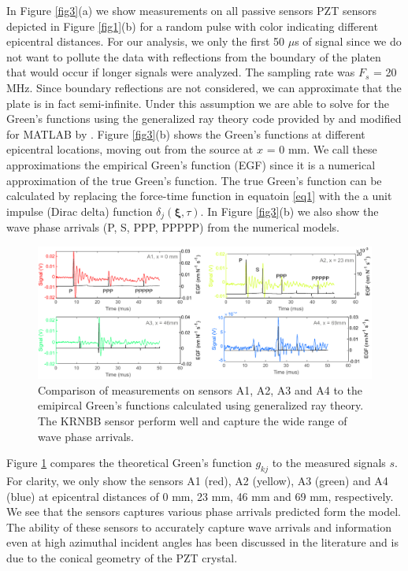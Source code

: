 \documentclass[preprint,3p, 11pt,authoryear]{elsarticle}
\begin{document}
{In Figure \ref{fig3}(a) we show measurements on all passive sensors PZT sensors depicted in Figure \ref{fig1}(b) for a random pulse with color indicating different epicentral distances. For our analysis, we only the first 50 $\mu$s of signal since we do not want to pollute the data with reflections from the boundary of the platen that would occur if longer signals were analyzed. The sampling rate was $F_{s}$ = 20 MHz. Since boundary reflections are not considered, we can approximate that the plate is in fact semi-infinite. Under this assumption we are able to solve for the Green's functions using the generalized ray theory code provided by \citet{Hsu1985} and modified for MATLAB by \citet{McLaskey2012}.  Figure \ref{fig3}(b) shows the Green's functions at different epicentral locations, moving out from the source at $x$ = 0 mm. We call these approximations the empirical Green's function (EGF) since it is a numerical approximation of the true Green's function.  The true Green's function can be calculated by replacing the force-time function in equatoin \eqref{eq1} with the a unit impulse (Dirac delta) function $\delta_{j}(\mathbf{\xi}, \tau)$. In Figure \ref{fig3}(b) we also show the wave phase arrivals (P, S, PPP, PPPPP) from the numerical models.

\begin{figure}[ht]
     	\centering
\includegraphics[scale= 0.90]{FIG4.pdf} 
\caption{Comparison of measurements on sensors A1, A2, A3 and A4 to the emipircal Green's functions calculated using generalized ray theory. The KRNBB sensor perform well and capture the wide range of wave phase arrivals.}
	\label{fig4} 
\end{figure}

Figure \ref{fig4} compares the theoretical Green's function $g_{kj}$ to the measured signals $s$.  For clarity, we only show the sensors A1 (red), A2 (yellow), A3 (green) and A4 (blue) at epicentral distances of 0 mm, 23 mm, 46 mm and 69 mm, respectively. We see that the sensors captures various phase arrivals predicted form the model. The ability of these sensors to accurately capture wave arrivals and information even at high azimuthal incident angles has been discussed in the literature \citep{Goodfellow2015, Selvadurai2019} and is due to the conical geometry of the PZT crystal. 

}
\end{document}
